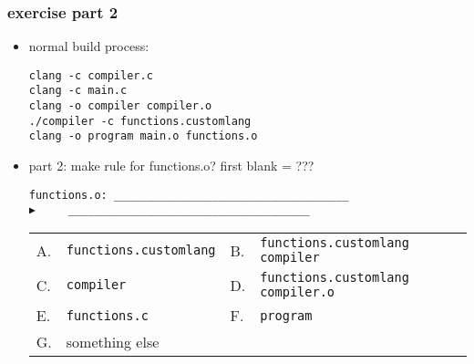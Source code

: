 \begin{FragileFrame}
\frametitle{exercise part 2}
    \begin{itemize}
    \item normal build process:
\begin{Verbatim}[frame=single,fontsize=\fontsize{10}{11}]
clang -c compiler.c
clang -c main.c
clang -o compiler compiler.o
./compiler -c functions.customlang
clang -o program main.o functions.o
\end{Verbatim}
    \item part 2: make rule for functions.o? first blank = ???
\begin{Verbatim}[frame=single,fontsize=\fontsize{11}{12}]
functions.o: ____________________________________
▶     _____________________________________
\end{Verbatim}
\begin{tabular}{llll}
A. & \texttt{functions.customlang} & B. & \texttt{functions.customlang compiler} \\
C. & \texttt{compiler} & D. & \texttt{functions.customlang compiler.o} \\
E. & \texttt{functions.c} & F. & \texttt{program} \\
G. & something else\\
\end{tabular}
    \end{itemize}
\end{FragileFrame}

